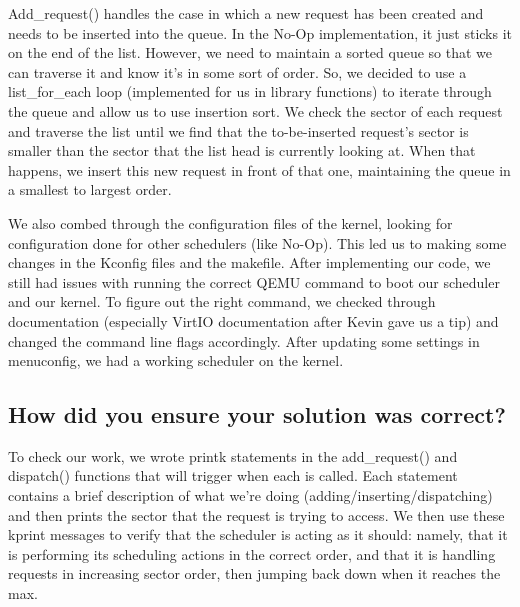 \documentclass[letterpaper,10pt,titlepage]{article}
\begin{document}
Add\_request() handles the case in which a new request has been created and needs to be inserted into the queue.
In the No-Op implementation, it just sticks it on the end of the list.
However, we need to maintain a sorted queue so that we can traverse it and know it's in some sort of order. 
So, we decided to use a list\_for\_each loop (implemented for us in library functions) to iterate through the queue and allow us to use insertion sort.
We check the sector of each request and traverse the list until we find that the to-be-inserted request's sector is smaller than the sector that the list head is currently looking at. When that happens, we insert this new request in front of that one, maintaining the queue in a smallest to largest order.

We also combed through the configuration files of the kernel, looking for configuration done for other schedulers (like No-Op). 
This led us to making some changes in the Kconfig files and the makefile. 
After implementing our code, we still had issues with running the correct QEMU command to boot our scheduler and our kernel.
To figure out the right command, we checked through documentation (especially VirtIO documentation after Kevin gave us a tip) and changed the command line flags accordingly. 
After updating some settings in menuconfig, we had a working scheduler on the kernel.

\subsection{How did you ensure your solution was correct?}
To check our work, we wrote printk statements in the add\_request() and dispatch() functions that will trigger when each is called. 
Each statement contains a brief description of what we're doing (adding/inserting/dispatching) and then prints the sector that the request is trying to access.
We then use these kprint messages to verify that the scheduler is acting as it should: 
namely, that it is performing its scheduling actions in the correct order, and that it is handling requests in increasing sector order, then jumping back down when it reaches the max.
\end{document}
